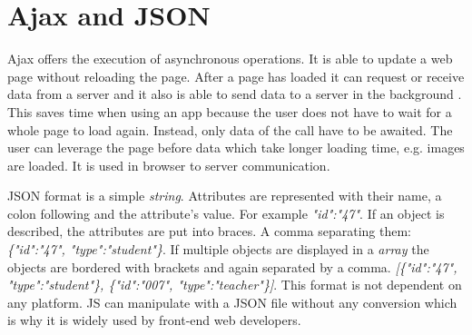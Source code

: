 \section{Ajax and JSON}
Ajax offers the execution of asynchronous operations. It is able to update a web page without reloading the page. After a page has loaded it can request or receive data from a server and it also is able to send data to a server in the background \cite{ajax-introduction}. This saves time when using an app because the user does not have to wait for a whole page to load again. Instead, only data of the call have to be awaited. The user can leverage the page before data which take longer loading time, e.g. images are loaded. It is used in browser to server communication.

JSON format \label{analysisJson} is a simple \textit{string}. Attributes are represented with their name, a colon following and the attribute's value. For example \textit{"id":"47"}. If an object is described, the attributes are put into braces. A comma separating them: \textit{\{"id":"47", "type":"student"\}}. If multiple objects are displayed in a \textit{array} the objects are bordered with brackets and again separated by a comma. \textit{[\{"id":"47", "type":"student"\}, \{"id":"007", "type":"teacher"\}]}. This format is not dependent on any platform. JS can manipulate with a JSON file without any conversion which is why it is widely used by front-end web developers.

